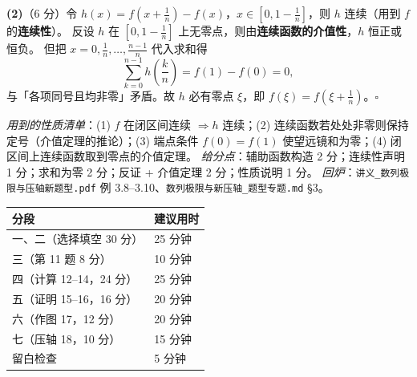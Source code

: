 \documentclass[11pt,a4paper]{ctexart}
\begin{document}
\textbf{(2)}（6 分）令 $h(x)=f(x+\frac1n)-f(x)$，$x\in[0,1-\frac1n]$，则 $h$ 连续（用到 $f$ 的\textbf{连续性}）。
反设 $h$ 在 $[0,1-\frac1n]$ 上无零点，则由\textbf{连续函数的介值性}，$h$ 恒正或恒负。
但把 $x=0,\frac1n,\dots,\frac{n-1}n$ 代入求和得
$$\sum_{k=0}^{n-1}h\!\left(\frac kn\right)=f(1)-f(0)=0,$$
与「各项同号且均非零」矛盾。故 $h$ 必有零点 $\xi$，即 $f(\xi)=f(\xi+\frac1n)$。\quad$\square$

\noindent\textit{用到的性质清单}：(1) $f$ 在闭区间连续 $\Rightarrow h$ 连续；(2) 连续函数若处处非零则保持定号（介值定理的推论）；(3) 端点条件 $f(0)=f(1)$ 使望远镜和为零；(4) 闭区间上连续函数取到零点的介值定理。
\textit{给分点}：辅助函数构造 2 分；连续性声明 1 分；求和为零 2 分；反证 + 介值定理 2 分；性质说明 1 分。
\textit{回炉}：\texttt{讲义\_数列极限与压轴新题型.pdf} 例 3.8--3.10、\texttt{数列极限与新压轴\_题型专题.md} §3。

\bigskip
\begin{center}
\begin{tabularx}{15.2cm}{@{}l X@{}}
\toprule
分段 & 建议用时 \\
\midrule
一、二（选择填空 30 分） & 25 分钟 \\
三（第 11 题 8 分） & 10 分钟 \\
四（计算 12--14，24 分） & 25 分钟 \\
五（证明 15--16，16 分） & 20 分钟 \\
六（作图 17，12 分） & 20 分钟 \\
七（压轴 18，10 分） & 15 分钟 \\
留白检查 & 5 分钟 \\
\bottomrule
\end{tabularx}
\end{center}

\end{document}
